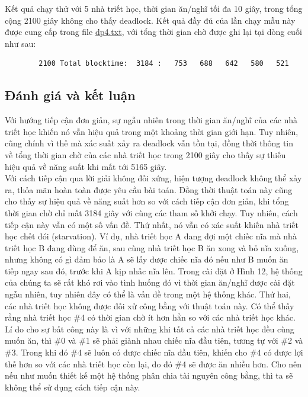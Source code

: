 \documentclass{article}
\begin{document}
Kết quả chạy thử với 5 nhà triết học, thời gian ăn/nghĩ tối đa 10 giây, trong tổng cộng 2100 giây
không cho thấy deadlock. Kết quả đầy đủ của lần chạy mẫu này được cung cấp trong file \href{www.github.com}{dp4.txt},
với tổng thời gian chờ được ghi lại tại dòng cuối như sau:
\begin{verbatim}
        2100 Total blocktime:  3184 :   753   688   642   580   521
\end{verbatim}
\subsection{Đánh giá và kết luận}
Với hướng tiếp cận đơn giản, sự ngẫu nhiên trong thời gian ăn/nghĩ của các nhà triết học khiến nó
vẫn hiệu quả trong một khoảng thời gian giới hạn. Tuy nhiên, cũng chính vì thế mà xác suất xảy ra deadlock
vẫn tồn tại, đồng thời thông tin về tổng thời gian chờ của các nhà triết học trong 2100 giây cho thấy sự
thiếu hiệu quả về năng suất khi mất tới 5165 giây. \\

Với cách tiếp cận qua lời giải không đối xứng, hiện tượng deadlock không thể xảy ra, thỏa mãn hoàn toàn được yêu cầu
bài toán. Đồng thời thuật toán này cũng cho thấy sự hiệu quả về năng suất hơn so với cách tiếp cận đơn giản,
khi tổng thời gian chờ chỉ mất 3184 giây với cùng các tham số khởi chạy.
Tuy nhiên, cách tiếp cận này vẫn có một số vấn đề. Thứ nhất, nó vẫn có xác suất khiến nhà triết học
chết đói (starvation). Ví dụ, nhà triết học A đang đợi một chiếc nĩa mà nhà triết học B đang dùng để ăn, sau cùng
nhà triết học B ăn xong và bỏ nĩa xuống, nhưng không có gì đảm bảo là A sẽ lấy được chiếc nĩa đó nếu như B muốn ăn
tiếp ngay sau đó, trước khi A kịp nhấc nĩa lên. Trong cài đặt ở Hình 12, hệ thống của chúng ta sẽ rất khó
rơi vào tình huống đó vì thời gian ăn/nghĩ được cài đặt ngẫu nhiên, tuy nhiên đây có thể là vấn đề
trong một hệ thống khác. Thứ hai, các nhà triết học không được đối xử công bằng với thuật toán này. Có thể
thấy rằng nhà triết học \#4 có thời gian chờ ít hơn hẳn so với các nhà triết học khác. Lí do cho sự bất công
này là vì với những khi tất cả các nhà triết học đều cùng muốn ăn, thì \#0 và \#1 sẽ phải giành nhau chiếc nĩa đầu tiên,
tương tự với \#2 và \#3. Trong khi đó \#4 sẽ luôn có được chiếc nĩa đầu tiên, khiến cho \#4 có được lợi thế hơn
so với các nhà triết học còn lại, do đó \#4 sẽ được ăn nhiều hơn. Cho nên nếu như muốn thiết kế một hệ thống
phân chia tài nguyên công bằng, thì ta sẽ không thể sử dụng cách tiếp cận này. \\
\end{document}
